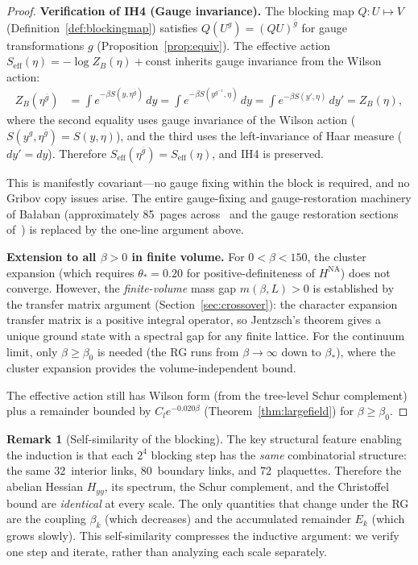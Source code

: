 \documentclass[11pt]{article}
\theoremstyle{definition}
\newtheorem{remark}[theorem]{Remark}
\begin{document}
\begin{proof}
\medskip\noindent\textbf{Verification of IH4 (Gauge invariance).}
The blocking map $Q:U\mapsto V$ (Definition~\ref{def:blockingmap})
satisfies $Q(U^g)=(QU)^{\bar g}$ for gauge transformations $g$
(Proposition~\ref{prop:equiv}).  The effective action
$S_{\mathrm{eff}}(\eta)=-\log Z_B(\eta)+\mathrm{const}$ inherits
gauge invariance from the Wilson action:
\begin{align}
Z_B(\eta^{\bar g})
&=\int e^{-\beta S(y,\eta^{\bar g})}\,dy
=\int e^{-\beta S(y^{g^{-1}},\eta)}\,dy
=\int e^{-\beta S(y',\eta)}\,dy'
=Z_B(\eta),
\end{align}
where the second equality uses gauge invariance of the Wilson action
($S(y^g,\eta^{\bar g})=S(y,\eta)$), and the third uses the
left-invariance of Haar measure ($dy'=dy$).  Therefore
$S_{\mathrm{eff}}(\eta^{\bar g})=S_{\mathrm{eff}}(\eta)$, and IH4
is preserved.

This is manifestly covariant---no gauge fixing within the block is
required, and no Gribov copy issues arise.  The entire gauge-fixing
and gauge-restoration machinery of Ba\l aban (approximately 85~pages
across~\cite{BalabanAvg,BalabanVar} and the gauge restoration
sections of~\cite{BalabanI,BalabanII}) is replaced by the one-line
argument above.

\medskip\noindent\textbf{Extension to all $\beta>0$ in finite volume.}
For $0<\beta<150$, the cluster expansion (which requires $\theta_*=0.20$
for positive-definiteness of $H^{\mathrm{NA}}$) does not converge.
However, the \emph{finite-volume} mass gap $m(\beta,L)>0$ is
established by the transfer matrix argument
(Section~\ref{sec:crossover}): the character expansion transfer
matrix is a positive integral operator, so Jentzsch's theorem
gives a unique ground state with a spectral gap for any finite
lattice.  For the continuum limit, only $\beta\ge\beta_0$
is needed (the RG runs from $\beta\to\infty$ down to $\beta_*$),
where the cluster expansion provides the volume-independent bound.

The effective action still has Wilson form (from the tree-level Schur
complement) plus a remainder bounded by $C_l e^{-0.020\beta}$
(Theorem~\ref{thm:largefield}) for $\beta\ge\beta_0$.
\end{proof}

\begin{remark}[Self-similarity of the blocking]\label{rem:selfsim}
The key structural feature enabling the induction is that each $2^4$
blocking step has the \emph{same} combinatorial structure: the same
32~interior links, 80~boundary links, and 72~plaquettes.  Therefore
the abelian Hessian $H_{yy}$, its spectrum, the Schur complement,
and the Christoffel bound are \emph{identical} at every
scale.  The only quantities that change under the RG are the coupling
$\beta_k$ (which decreases) and the accumulated remainder $E_k$
(which grows slowly).  This self-similarity compresses the inductive
argument: we verify one step and iterate, rather than analyzing each
scale separately.
\end{remark}
\end{document}

